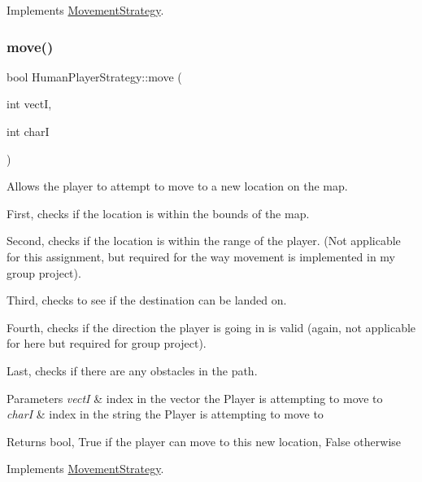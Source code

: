 Implements \hyperlink{class_movement_strategy}{Movement\+Strategy}.

\hypertarget{class_human_player_strategy_ab798317a51caba9ada8e5bd2f9a5bd13}{}\label{class_human_player_strategy_ab798317a51caba9ada8e5bd2f9a5bd13} 
\subsubsection{\texorpdfstring{move()}{move()}\hspace{0.1cm}{\footnotesize\ttfamily [1/2]}}
{\footnotesize\ttfamily bool Human\+Player\+Strategy\+::move (\begin{DoxyParamCaption}\item[{int}]{vectI,  }\item[{int}]{charI }\end{DoxyParamCaption})\hspace{0.3cm}{\ttfamily [virtual]}}

Allows the player to attempt to move to a new location on the map. 

First, checks if the location is within the bounds of the map. 

Second, checks if the location is within the range of the player. (Not applicable for this assignment, but required for the way movement is implemented in my group project). 

Third, checks to see if the destination can be landed on. 

Fourth, checks if the direction the player is going in is valid (again, not applicable for here but required for group project). 

Last, checks if there are any obstacles in the path. 
\begin{DoxyParams}{Parameters}
{\em vectI} & index in the vector the Player is attempting to move to \\
\hline
{\em charI} & index in the string the Player is attempting to move to \\
\hline
\end{DoxyParams}
\begin{DoxyReturn}{Returns}
bool, True if the player can move to this new location, False otherwise 
\end{DoxyReturn}


Implements \hyperlink{class_movement_strategy_aae0f9fb25af037c5681fa2e16bcd23f9}{Movement\+Strategy}.

